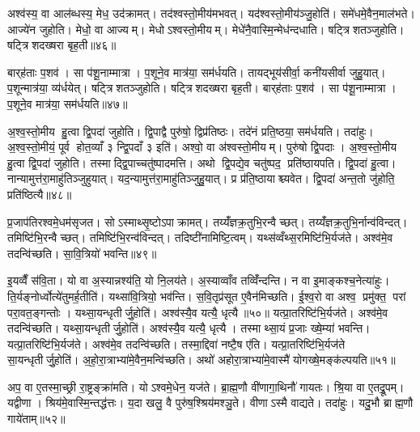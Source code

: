 अश्व॑स्य॒ वा आल॑ब्धस्य॒ मेध॒ उद॑क्रामत्। तद॑श्वस्तो॒मीय॑मभवत्। यद॑श्वस्तो॒मीय॑ञ्जु॒होति॑। समे॑धमे॒वैन॒माल॑भते। आज्ये॑न जुहोति। मेधो॒ वा आज्यम्। मेधोऽश्वस्तो॒मीयम्। मेधे॑नै॒वास्मि॒न्मेध॑न्दधाति। षट्त्रिशतञ्जुहोति। षट्त्रिशदख्षरा बृह॒ती॥४६॥

बार्‌ह॑ताः प॒शव॑। सा प॑शू॒नाम्मात्रा। प॒शूने॒व मात्र॑या॒ सम॑र्धयति। तायद्भूय॑सीर्वा॒ कनी॑यसीर्वा जुहु॒यात्। प॒शून्मात्र॑या॒ व्य॑र्धयेत्। षट्त्रिशतञ्जुहोति। षट्त्रिशदख्षरा बृह॒ती। बार्‌ह॑ताः प॒शव॑। सा प॑शू॒नाम्मात्रा। प॒शूने॒व मात्र॑या॒ सम॑र्धयति॥४७॥

अ॒श्व॒स्तो॒मीय हु॒त्वा द्वि॒पदा॑ जुहोति। द्वि॒पाद्वै पुरु॑षो॒ द्विप्र॑तिष्ठः। तदे॑नं प्रति॒ष्ठया॒ सम॑र्धयति। तदा॑हुः। अ॒श्व॒स्तो॒मीयं॒ पूर्व होत॒व्याँ ३ न्द्वि॒पदाँ ३ इति॑। अश्वो॒ वा अ॑श्वस्तो॒मीयम्। पुरु॑षो द्वि॒पदाः। अ॒श्व॒स्तो॒मीय हु॒त्वा द्वि॒पदा॑ जुहोति। तस्माद्द्वि॒पाच्चतु॑ष्पादमत्ति। अथो द्वि॒पद्ये॒व चतु॑ष्पद॒ प्रति॑ष्ठायपति। द्वि॒पदा॑ हु॒त्वा। नान्यामुत्त॑रा॒माहु॑तिञ्जुहुयात्। यद॒न्यामुत्त॑रा॒माहु॑तिञ्जुहु॒यात्। प्र प्र॑ति॒ष्ठायाश्च्यवेत। द्वि॒पदा॑ अन्त॒तो जु॑होति॒ प्रति॑ष्ठित्यै॥४८॥

प्र॒जाप॑तिरश्वमे॒धम॑सृजत। सोऽस्माथ्सृ॒ष्टोऽपाक्रामत्। तय्यँ॑ज्ञक्र॒तुभि॒रन्वैच्छत्। तय्यँ॑ज्ञक्र॒तुभि॒र्नान्व॑विन्दत्। तमिष्टि॑भि॒रन्वैच्छत्। तमिष्टि॑भि॒रन्व॑विन्दत्। तदिष्टी॑नामिष्टि॒त्वम्। यथ्स॑व्वँथ्स॒रमिष्टि॑भि॒र्यज॑ते। अश्व॑मे॒व तदन्वि॑च्छति। सा॒वि॒त्रियो॑ भवन्ति॥४९॥

इ॒यव्वैँ स॑वि॒ता। यो वा अ॒स्यान्नश्य॑ति॒ यो नि॒लय॑ते। अ॒स्याव्वाँव तव्विँ॑न्दन्ति। न वा इ॒माङ्कश्च॒नेत्या॑हुः। ति॒र्यङ्नोर्ध्वोत्ये॑तुमर्ह॒तीति॑। यथ्सा॑वि॒त्रियो॒ भव॑न्ति। स॒वि॒तृप्र॑सूत ए॒वैन॑मिच्छति। ई॒श्व॒रो वा अश्व॒ प्रमु॑क्त॒ परां परा॒वत॒ङ्गन्तोः। यथ्सा॒यन्धृतीर्जु॒होति॑। अश्व॑स्यै॒व यत्यै॒ धृत्यै॥५०॥ यत्प्रा॒तरिष्टि॑भि॒र्यज॑ते। अश्व॑मे॒व तदन्वि॑च्छति। यथ्सा॒यन्धृतीर्जु॒होति॑। अश्व॑स्यै॒व यत्यै॒ धृत्यै। तस्माथ्सा॒यं प्र॒जाः ख्षे॒म्या॑ भवन्ति। यत्प्रा॒तरिष्टि॑भि॒र्यज॑ते। अश्व॑मे॒व तदन्वि॑च्छति। तस्मा॒द्दिवा॑ नष्टै॒ष ए॑ति। यत्प्रा॒तरिष्टि॑भि॒र्यज॑ते सा॒यन्धृतीर्जु॒होति॑। अ॒हो॒रा॒त्राभ्या॑मे॒वैन॒मन्वि॑च्छति। अथो॑ अहोरा॒त्राभ्या॑मे॒वास्मै॑ योगख्षे॒मङ्क॑ल्पयति॥५१॥\anuvakamend[भ॒व॒न्ति॒ धृत्या॑ एन॒मन्वि॑च्छ॒त्येक॑ञ्च]

अप॒ वा ए॒तस्मा॒च्छ्री रा॒ष्ट्रङ्क्रा॑मति। योऽश्वमे॒धेन॒ यज॑ते। ब्रा॒ह्म॒णौ वी॑णागा॒थिनौ॑ गायतः। श्रि॒या वा ए॒तद्रू॒पम्। यद्वीणा। श्रिय॑मे॒वास्मि॒न्तद्ध॑त्तः। य॒दा खलु॒ वै पुरु॑ष॒श्श्रिय॑मश्ञु॒ते। वीणाऽस्मै वाद्यते। तदा॑हुः। यदु॒भौ ब्राह्म॒णौ गाये॑ताम्॥५२॥


